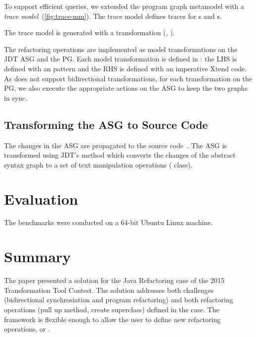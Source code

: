 \documentclass[submission,copyright,creativecommons]{eptcs}
\begin{document}
To support efficient queries, we extended the program graph metamodel with a \emph{trace model}~(\autoref{fig:trace-mm}). The trace model defines traces for s and s.

The trace model is generated with a \viatra transformation (, ).

The refactoring operations are implemented as model transformations on the JDT ASG and the PG. Each model transformation is defined in \viatra: the LHS is defined with an \eiq pattern and the RHS is defined with an imperative Xtend code. As \viatra does not support bidirectional transformations, for each transformation on the PG, we also execute the appropriate actions on the ASG to keep the two graphs in sync.


\subsection{Transforming the ASG to Source Code}

The changes in the ASG are propagated to the source code~. The ASG is transformed using JDT's  method which converts the changes of the abstract syntax graph to a set of text manipulation operations ( class).

\section{Evaluation}

The benchmarks were conducted on a 64-bit Ubuntu Linux machine.


\section{Summary}

The paper presented a solution for the Java Refactoring case of the 2015 Transformation Tool Contest. The solution addresses both challenges (bidirectional synchrosiation and program refactoring) and both refactoring operations (pull up method, create superclass) defined in the case. The framework is flexible enough to allow the user to define new refactoring operations, \eg {} or .



\end{document}
